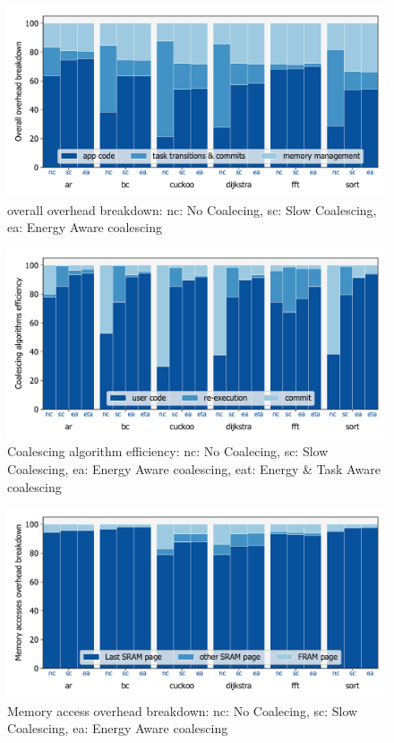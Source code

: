 
\begin{figure}
	\centering
	\includegraphics[width=\columnwidth]{figures/overallOverhead}
	\caption{ overall overhead breakdown: nc: No Coalecing, sc: Slow Coalescing, ea: Energy Aware coalescing }
	\label{fig:overallOverheadBreakdown}
\end{figure}


\begin{figure}
	\centering
	\includegraphics[width=\columnwidth]{figures/coalEfficiency}
	\caption{ Coalescing algorithm efficiency:  nc: No Coalecing, sc: Slow Coalescing, ea: Energy Aware coalescing, eat: Energy \& Task Aware coalescing }
	\label{fig:coalEfficiency}
\end{figure}

\begin{figure}
	\centering
	\includegraphics[width=\columnwidth]{figures/memAccess}
	\caption{ Memory access overhead breakdown:  nc: No Coalecing, sc: Slow Coalescing, ea: Energy Aware coalescing }
	\label{fig:coalEfficiency}
\end{figure}

